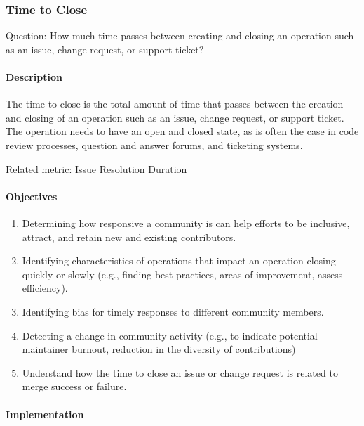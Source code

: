 \hypertarget{time-to-close}{%
\subsubsection{Time to Close}\label{time-to-close}}

Question: How much time passes between creating and closing an operation
such as an issue, change request, or support ticket?

\hypertarget{description}{%
\paragraph{Description}\label{description}}

The time to close is the total amount of time that passes between the
creation and closing of an operation such as an issue, change request,
or support ticket. The operation needs to have an open and closed state,
as is often the case in code review processes, question and answer
forums, and ticketing systems.

Related metric:
\href{https://chaoss.community/metric-issue-resolution-duration/}{Issue
Resolution Duration}

\hypertarget{objectives}{%
\paragraph{Objectives}\label{objectives}}

\begin{enumerate}
\def\labelenumi{\arabic{enumi}.}
\tightlist
\item
  Determining how responsive a community is can help efforts to be
  inclusive, attract, and retain new and existing contributors.
\item
  Identifying characteristics of operations that impact an operation
  closing quickly or slowly (e.g., finding best practices, areas of
  improvement, assess efficiency).
\item
  Identifying bias for timely responses to different community members.
\item
  Detecting a change in community activity (e.g., to indicate potential
  maintainer burnout, reduction in the diversity of contributions)
\item
  Understand how the time to close an issue or change request is related
  to merge success or failure.
\end{enumerate}

\hypertarget{implementation}{%
\paragraph{Implementation}\label{implementation}}

